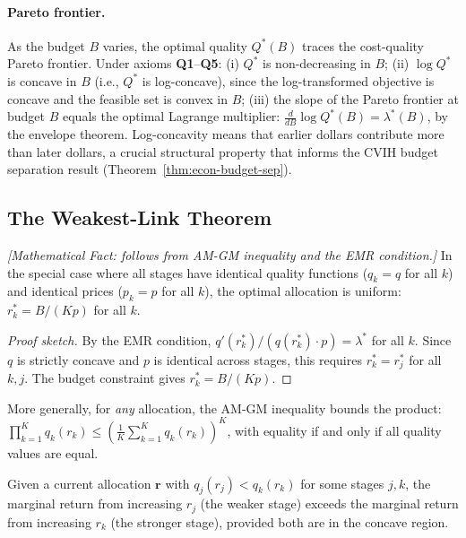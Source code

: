 \paragraph{Pareto frontier.} As the budget $B$ varies, the optimal quality $Q^*(B)$ traces the cost-quality Pareto frontier. Under axioms \textbf{Q1}--\textbf{Q5}: (i) $Q^*$ is non-decreasing in $B$; (ii) $\log Q^*$ is concave in $B$ (i.e., $Q^*$ is log-concave), since the log-transformed objective is concave and the feasible set is convex in $B$; (iii) the slope of the Pareto frontier at budget $B$ equals the optimal Lagrange multiplier: $\frac{d}{dB}\log Q^*(B) = \lambda^*(B)$, by the envelope theorem. Log-concavity means that earlier dollars contribute more than later dollars, a crucial structural property that informs the CVIH budget separation result (Theorem~\ref{thm:econ-budget-sep}).

\subsection{The Weakest-Link Theorem}

\begin{theorem}
\label{thm:econ-weakest-link}
\emph{[Mathematical Fact: follows from AM-GM inequality and the EMR condition.]}
In the special case where all stages have identical quality functions ($q_k = q$ for all $k$) and identical prices ($p_k = p$ for all $k$), the optimal allocation is uniform: $r_k^* = B / (Kp)$ for all $k$.
\end{theorem}

\begin{proof}[Proof sketch]
By the EMR condition, $q'(r_k^*) / (q(r_k^*) \cdot p) = \lambda^*$ for all $k$. Since $q$ is strictly concave and $p$ is identical across stages, this requires $r_k^* = r_j^*$ for all $k, j$. The budget constraint gives $r_k^* = B/(Kp)$.
\end{proof}

More generally, for \emph{any} allocation, the AM-GM inequality bounds the product: $\prod_{k=1}^K q_k(r_k) \leq \left(\frac{1}{K} \sum_{k=1}^K q_k(r_k)\right)^K$, with equality if and only if all quality values are equal.

\begin{corollary}
\label{cor:econ-raise-floor}
Given a current allocation $\mathbf{r}$ with $q_j(r_j) < q_k(r_k)$ for some stages $j, k$, the marginal return from increasing $r_j$ (the weaker stage) exceeds the marginal return from increasing $r_k$ (the stronger stage), provided both are in the concave region.
\end{corollary}

